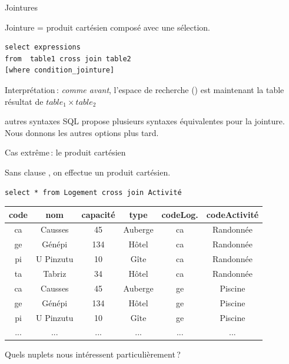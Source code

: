 

\begin{frame}[fragile]{Jointures}

Jointure =  \alert{produit cartésien} composé
avec une \alert{sélection}.

\vfill

\begin{verbatim}
select expressions
from  table1 cross join table2
[where condition_jointure]
\end{verbatim}

\vfill

\alert{Interprétation}\,: \textit{comme avant}, l'espace de recherche ()
est maintenant la table résultat de $table_1 \times table_2$

\vfill
\begin{remblock}{autres syntaxes}
SQL propose plusieurs syntaxes équivalentes pour
la jointure. Nous donnons les autres options plus tard.
\end{remblock}

\end{frame}


\begin{frame}[fragile]{Cas extrême\,: le produit cartésien}

Sans clause , on effectue un \alert{produit cartésien}.

\vfill

\begin{verbatim}
select * from Logement cross join Activité
\end{verbatim}

\vfill
\begin{footnotesize}
\begin{tabular}{c|c|c|c|c|c}
\textbf{code} & \textbf{nom} & \textbf{capacité} & \textbf{type} & \textbf{codeLog.} & \textbf{codeActivité}\\ \hline 
ca & Causses & 45 & Auberge & ca & Randonnée\\ \hline 
ge & Génépi & 134 & Hôtel & ca & Randonnée\\ \hline 
pi & U Pinzutu & 10 & Gîte & ca & Randonnée\\ \hline 
ta & Tabriz & 34 & Hôtel & ca & Randonnée\\ \hline 
ca & Causses & 45 & Auberge & ge & Piscine\\ \hline 
ge & Génépi & 134 & Hôtel & ge & Piscine\\ \hline 
pi & U Pinzutu & 10 & Gîte & ge & Piscine\\ \hline 
... & ... & ... & ... & ... & ...\\ \hline 
\end{tabular}
\end{footnotesize}

\vfill

Quels nuplets nous intéressent particulièrement\,?

\end{frame}


